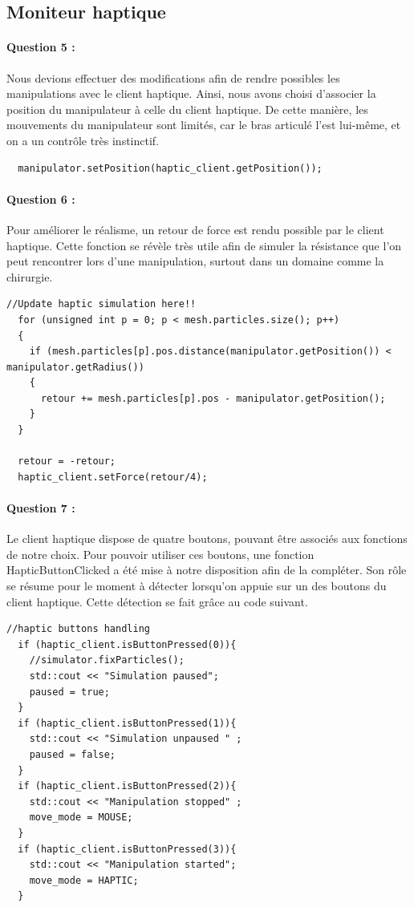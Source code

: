 \documentclass[a4paper,12pt]{article}
\begin{document}
\subsection{Moniteur haptique}
\paragraph{Question 5 :} Nous devions effectuer des modifications afin de rendre possibles les manipulations avec le client haptique. Ainsi, nous avons choisi d'associer la position du manipulateur à celle du client haptique. De cette manière, les mouvements du manipulateur sont limités, car le bras articulé l'est lui-même, et on a un contrôle très instinctif.
\newpage\begin{lstlisting}
  manipulator.setPosition(haptic_client.getPosition());
\end{lstlisting}

\paragraph{Question 6 :} Pour améliorer le réalisme, un retour de force est rendu possible par le client haptique. Cette fonction se révèle très utile afin de simuler la résistance que l'on peut rencontrer lors d'une manipulation, surtout dans un domaine comme la chirurgie.
\begin{lstlisting}
//Update haptic simulation here!!
  for (unsigned int p = 0; p < mesh.particles.size(); p++)
  {
    if (mesh.particles[p].pos.distance(manipulator.getPosition()) < manipulator.getRadius())
    {
      retour += mesh.particles[p].pos - manipulator.getPosition();
    }
  }

  retour = -retour;
  haptic_client.setForce(retour/4);
\end{lstlisting}

\paragraph{Question 7 :} Le client haptique dispose de quatre boutons, pouvant être associés aux fonctions de notre choix. Pour pouvoir utiliser ces boutons, une fonction \og{}HapticButtonClicked\fg{} a été mise à notre disposition afin de la compléter. Son rôle se résume pour le moment à détecter lorsqu'on appuie sur un des boutons du client haptique. Cette détection se fait grâce au code suivant.
\begin{lstlisting}
//haptic buttons handling
  if (haptic_client.isButtonPressed(0)){
    //simulator.fixParticles();
    std::cout << "Simulation paused"; 
    paused = true;
  }
  if (haptic_client.isButtonPressed(1)){
    std::cout << "Simulation unpaused " ;
    paused = false;
  }
  if (haptic_client.isButtonPressed(2)){
    std::cout << "Manipulation stopped" ;
    move_mode = MOUSE;
  }
  if (haptic_client.isButtonPressed(3)){
    std::cout << "Manipulation started";
    move_mode = HAPTIC;
  }
\end{lstlisting}
\end{document}

